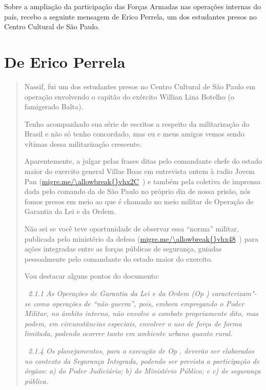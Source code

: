 

Sobre a ampliação da participação das Forças Armadas nas operações
internas do país, recebo a seguinte mensagem de Erico Perrela, um dos
estudantes presos no Centro Cultural de São Paulo.

\section{De Erico Perrela}

\begin{quote}
Nassif, fui um dos estudantes presos no Centro Cultural de São Paulo em
operação envolvendo o capitão do exército Willian Lina Botelho (o
famigerado Balta).

Tenho acompanhado sua série de escritos a respeito da militarização do
Brasil e não só tenho concordado, mas eu e meus amigos vemos sendo
vítimas dessa militarização crescente.

Aparentemente, a julgar pelas frases ditas pelo comandante chefe do
estado maior do exercito general Villas Boas em entrevista ontem à radio
Jovem Pan (\url{migre.me/\allowbreak{}vhx2C}~) e também pela coletiva de
imprensa dada pelo comando da  de São Paulo no próprio dia de nossa
prisão, nós fomos presos em meio ao que é chamado no meio militar de
Operação de Garantia da Lei e da Ordem.

 Não sei se você teve oportunidade de observar essa ``norma'' militar,
publicada pelo ministério da defesa (\url{migre.me/\allowbreak{}vhx48}~) para
ações integradas entre as forças públicas de segurança, guiadas
pessoalmente pelo comandante do estado maior do exercito.

 Vou destacar alguns pontos do documento:

\emph{~2.1.1 As Operações de Garantia da Lei e da Ordem (Op )
caracterizam"-se como operações de ``não guerra'', pois, embora
empregando o Poder Militar, no âmbito interno, não envolve o combate
propriamente dito, mas podem, em circunstâncias especiais, envolver o
uso de força de forma limitada, podendo ocorrer tanto em ambiente urbano
quanto rural.}

\emph{~2.1.4 Os planejamentos, para a execução de Op , deverão ser
elaborados no contexto da Segurança Integrada, podendo ser prevista a
participação de órgãos: a) do Poder Judiciário; b) do Ministério
Público; e c) de segurança pública.}


\end{quote}
